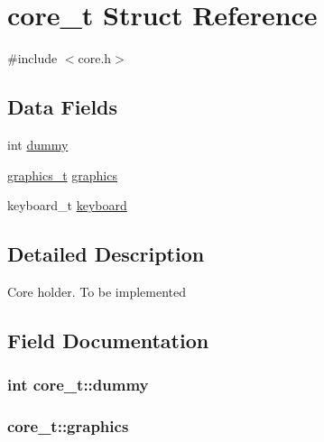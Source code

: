 \hypertarget{structcore__t}{}\section{core\+\_\+t Struct Reference}
\label{structcore__t}


{\ttfamily \#include $<$core.\+h$>$}

\subsection*{Data Fields}
\begin{DoxyCompactItemize}
\item 
int \hyperlink{structcore__t_aa8a3cd0e77fc7a69f992186415f6e6a1}{dummy}
\item 
\hyperlink{structgraphics__t}{graphics\+\_\+t} \hyperlink{structcore__t_a4728ed027923dd8568023862dd2887ef}{graphics}
\item 
keyboard\+\_\+t \hyperlink{structcore__t_aaed73e0d01ec7b4f6ad9056810b24652}{keyboard}
\end{DoxyCompactItemize}


\subsection{Detailed Description}
Core holder. To be implemented 

\subsection{Field Documentation}
\subsubsection[{\texorpdfstring{dummy}{dummy}}]{\setlength{\rightskip}{0pt plus 5cm}int core\+\_\+t\+::dummy}\hypertarget{structcore__t_aa8a3cd0e77fc7a69f992186415f6e6a1}{}\label{structcore__t_aa8a3cd0e77fc7a69f992186415f6e6a1}
\subsubsection[{\texorpdfstring{graphics}{graphics}}]{ core\+\_\+t\+::graphics}\hypertarget{structcore__t_a4728ed027923dd8568023862dd2887ef}{}\label{structcore__t_a4728ed027923dd8568023862dd2887ef}
